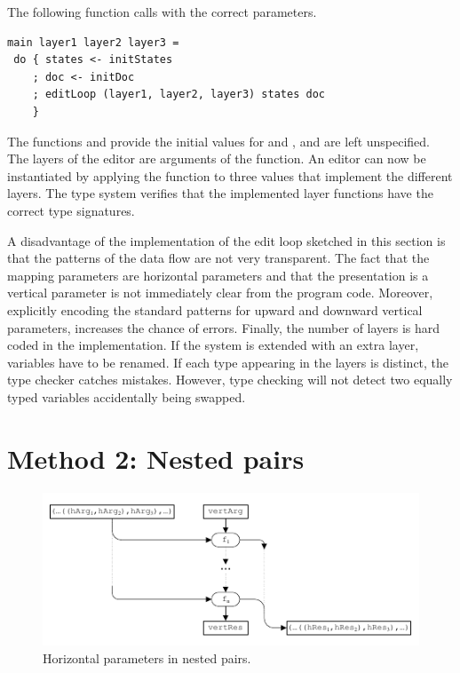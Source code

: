\documentclass[preprint,natbib]{sigplanconf}
\begin{document}
The following function  calls  with the correct parameters.

\begin{small}
\begin{verbatim}
main layer1 layer2 layer3 = 
 do { states <- initStates
    ; doc <- initDoc 
    ; editLoop (layer1, layer2, layer3) states doc
    }
\end{verbatim}
\end{small}

The functions  and  provide the initial values for  and , and are left unspecified. The layers of the editor are arguments of the  function. An editor can now be instantiated by applying the function  to three  values that implement the different layers. The type system verifies that the implemented layer functions have the correct type signatures.

A disadvantage of the implementation of the edit loop sketched in this section is that the patterns of the data flow are not very transparent. The fact that the mapping parameters are horizontal parameters and that the presentation is a vertical parameter is not immediately clear from the program code. Moreover, explicitly encoding the standard patterns for upward and downward vertical parameters, increases the chance of errors. Finally, the number of layers is hard coded in the implementation. If the system is extended with an extra layer, variables have to be renamed. If each type appearing in the layers is distinct, the type checker catches mistakes. However, type checking will not detect two equally typed variables accidentally being swapped.


%																
%																
%																
\section{Method 2: Nested pairs}\label{sect:ncp}

\begin{figure}
\includegraphics[width=\columnwidth]{images/NestedPairs}
\caption{Horizontal parameters in nested pairs.}\label{ncp} 
\end{figure}
\end{document}
